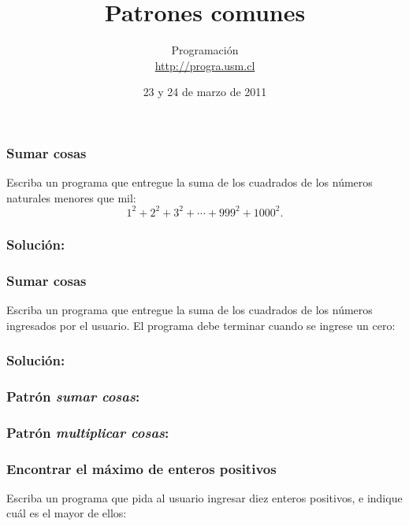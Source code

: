 \documentclass[12pt]{beamer}
\title{Patrones comunes}
\author{
  Programación \\ \url{http://progra.usm.cl}
}
\date{23 y 24 de marzo de 2011}
\begin{document}
  \begin{frame}
    \maketitle
  \end{frame}

  \begin{frame}
    \frametitle{Sumar cosas}
    Escriba un programa que entregue la suma
    de los cuadrados de los números naturales
    menores que mil:
    \[
      1^2 + 2^2 + 3^2 + \cdots + 999^2 + 1000^2.
    \]
  \end{frame}

  \begin{frame}
    \frametitle{Solución:}
    
  \end{frame}

  \begin{frame}
    \frametitle{Sumar cosas}
    Escriba un programa que entregue la suma
    de los cuadrados de los números ingresados por el usuario.
    El programa debe terminar
    cuando se ingrese un cero:
    
  \end{frame}

  \begin{frame}
    \frametitle{Solución:}
    
  \end{frame}

  \begin{frame}
    \frametitle{Patrón \emph{sumar cosas}:}
    
  \end{frame}

  \begin{frame}
    \frametitle{Patrón \emph{multiplicar cosas}:}
    
  \end{frame}

  \begin{frame}
    \frametitle{Encontrar el máximo de enteros positivos}
    Escriba un programa que pida al usuario
    ingresar diez enteros positivos,
    e indique cuál es el mayor de ellos:
    
  \end{frame}
\end{document}
